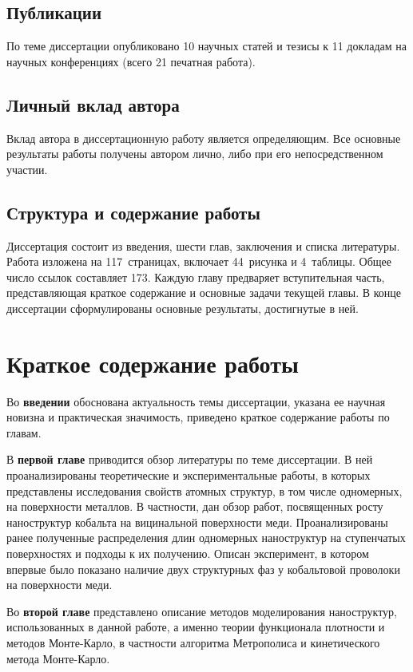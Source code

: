 \documentclass[10pt]{book}
\begin{document}
\section{Публикации}
По теме диссертации опубликовано 10 научных статей и тезисы к 11 докладам на научных конференциях (всего 21 печатная работа).

\section{Личный вклад автора}
Вклад автора в диссертационную работу является определяющим. Все основные результаты работы получены автором лично, либо при его непосредственном участии.

\section{Структура и содержание работы}
Диссертация состоит из введения, шести глав, заключения и списка литературы.
Работа изложена на 117~страницах, включает 44~рисунка и 4~таблицы. Общее число ссылок составляет 173.
Каждую главу предваряет вступительная часть, представляющая краткое содержание и основные задачи текущей главы.
В конце диссертации сформулированы основные результаты, достигнутые в ней.


\chapter{Краткое содержание работы}

Во \textbf{введении} обоснована актуальность темы диссертации, указана ее научная новизна и практическая значимость, приведено краткое содержание работы по главам.

В \textbf{первой главе} приводится обзор литературы по теме диссертации. В ней проанализированы теоретические и экспериментальные работы, в которых представлены исследования свойств атомных структур, в том числе одномерных, на поверхности металлов. В частности, дан обзор  работ, посвященных росту наноструктур кобальта на вицинальной поверхности меди. Проанализированы ранее полученные распределения длин одномерных наноструктур на ступенчатых поверхностях и подходы к их получению.
Описан эксперимент, в котором впервые было показано наличие двух структурных фаз у кобальтовой проволоки на поверхности меди.

Во \textbf{второй главе} представлено описание методов моделирования наноструктур, использованных в данной работе, а именно теории функционала плотности и методов Монте-Карло, в частности алгоритма Метрополиса и кинетического метода Монте-Карло.
\end{document}
